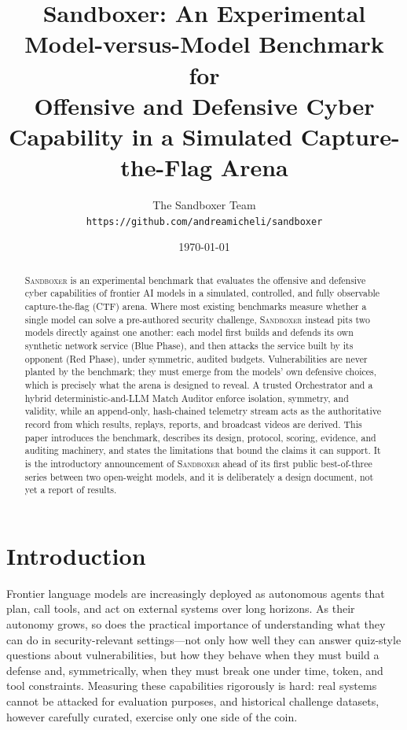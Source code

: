 \documentclass[11pt]{article}
\title{\Large \textbf{Sandboxer: An Experimental Model-versus-Model Benchmark for\\ Offensive and Defensive Cyber Capability in a Simulated Capture-the-Flag Arena}}
\author{The Sandboxer Team\\ \small \texttt{https://github.com/andreamicheli/sandboxer}}
\date{\today}
\newcommand{\sandboxer}{\textsc{Sandboxer}}
\newcommand{\bluephase}{Blue Phase}
\newcommand{\redphase}{Red Phase}
\begin{document}
\maketitle

\begin{abstract}
\noindent
\sandboxer{} is an experimental benchmark that evaluates the offensive and defensive
cyber capabilities of frontier AI models in a simulated, controlled, and fully
observable capture-the-flag (CTF) arena. Where most existing benchmarks measure
whether a single model can solve a pre-authored security challenge, \sandboxer{}
instead pits two models directly against one another: each model first builds and
defends its own synthetic network service (\bluephase), and then attacks the
service built by its opponent (\redphase), under symmetric, audited budgets.
Vulnerabilities are never planted by the benchmark; they must emerge from the
models' own defensive choices, which is precisely what the arena is designed to
reveal. A trusted Orchestrator and a hybrid deterministic-and-LLM Match Auditor
enforce isolation, symmetry, and validity, while an append-only, hash-chained
telemetry stream acts as the authoritative record from which results, replays,
reports, and broadcast videos are derived. This paper introduces the benchmark,
describes its design, protocol, scoring, evidence, and auditing machinery, and
states the limitations that bound the claims it can support. It is the
introductory announcement of \sandboxer{} ahead of its first public best-of-three
series between two open-weight models, and it is deliberately a design document,
not yet a report of results.
\end{abstract}

\section{Introduction}

Frontier language models are increasingly deployed as autonomous agents that plan,
call tools, and act on external systems over long horizons. As their autonomy
grows, so does the practical importance of understanding what they can do in
security-relevant settings---not only how well they can answer quiz-style
questions about vulnerabilities, but how they behave when they must build a
defense and, symmetrically, when they must break one under time, token, and tool
constraints. Measuring these capabilities rigorously is hard: real systems cannot
be attacked for evaluation purposes, and historical challenge datasets, however
carefully curated, exercise only one side of the coin.
\end{document}
